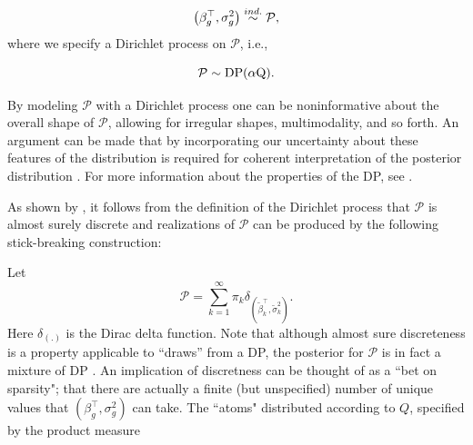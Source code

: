 \begin{equation}
\left(\beta_g^\top,\sigma^2_g\right) \stackrel{ind.}{\sim} \mathcal{P},
\end{equation}
where we specify a Dirichlet process on $\mathcal{P}$, i.e.,

\begin{equation}
\mathcal{P} \sim \operatorname{DP}(\alpha \mbox{Q}).
\end{equation}

\iftoggle{thesis}{
The use of this prior, due to \citet{ferguson}, is a distribution over probability distributions, such that for any finite disjoint partition $\{A_i\}_{i>=1}^n$ on $\mathbb{R}^p$, $\mathcal{P}$ is a random measure such that the joint distribution $\left(\mathcal{P}(A_1),\ldots,\mathcal{P}(A_n)\right) \sim \op{Dir}\left(\alpha Q(A_1),\ldots,\alpha Q(A_n)\right).$ The Dirichlet process has two parameters: $Q$, the base measure, represents a prior guess at the distribution. $\alpha$, the concentration parameter expresses the degree to which $\mathcal{P}$ will agree with $Q$ on any set $A$. This follows from the definition given above and known properties of the Dirichlet distribution, i.e., $\op{E}\left(\mathcal{P}(A)\right)=Q(A)$, and $\op{V}\left(\mathcal{P}(A)\right)=\frac{Q(A)(1 - Q(A)}{\alpha + 1}$, showing that $\mathcal{P}(A) \stackrel{p}{\rightarrow} Q(A)$ as $\alpha \rightarrow \infty$ for any set $A$. 
}{}
By modeling $\mathcal{P}$ with a Dirichlet process one can be noninformative about the overall shape of $\mathcal{P}$, allowing for irregular shapes, multimodality, and so forth. An argument can be made that by incorporating our uncertainty about these features of the distribution is required for coherent interpretation of the posterior distribution \citep{walker2010bayesian}. For more information about the properties of the DP, see \cite{ferguson}.

As shown by \citet{sethuraman}, it follows from the definition of the Dirichlet process that $\mathcal{P}$ is almost surely discrete and realizations of $\mathcal{P}$ can be produced by the following stick-breaking construction:

Let 
\begin{equation}
\mathcal{P} =\sum_{k=1}^\infty \pi_k \delta_{\left(\tilde{\beta}_k^\top ,\tilde{\sigma}^2_k\right)}.
\end{equation}
Here $\delta_{(.)}$ is the Dirac delta function. Note that although almost sure discreteness is a property applicable to ``draws'' from a DP, the posterior for $\mathcal{P}$ is in fact a mixture of DP \citep{antoniak}. An implication of discretness can be thought of as a ``bet on sparsity"; that there are actually a finite (but unspecified) number of unique values that $(\beta_g^\top,\sigma^2_g)$ can take.  
 The ``atoms" distributed according to $Q$, specified by the product measure

